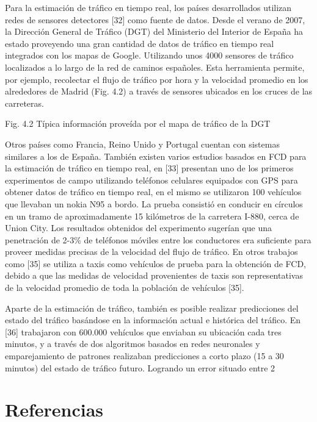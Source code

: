 \documentclass[final,fmstyle]{fpunathesis}
\begin{document}
Para la estimación de tráfico en tiempo real, los países desarrollados utilizan redes de sensores detectores [32] como fuente de datos. Desde el verano de 2007, la Dirección General de Tráfico (DGT) del Ministerio del Interior de España ha estado proveyendo una gran cantidad de datos de tráfico en tiempo real integrados con los mapas de Google. Utilizando unos 4000 sensores de tráfico localizados a lo largo de la red de caminos españoles. Esta herramienta permite, por ejemplo, recolectar el flujo de tráfico por hora y la velocidad promedio en los alrededores de Madrid (Fig. 4.2) a través de sensores ubicados en los cruces de las carreteras.

Fig. 4.2 Típica información proveída por el mapa de tráfico de la DGT

Otros países como Francia, Reino Unido y Portugal cuentan con sistemas similares a los de España. También existen varios estudios basados en FCD para la estimación de tráfico en tiempo real, en [33] presentan uno de los primeros experimentos de campo utilizando teléfonos celulares equipados con GPS para obtener datos de tráfico en tiempo real, en el mismo se utilizaron 100 vehículos que llevaban un nokia N95 a bordo. La prueba consistió en conducir en círculos en un tramo de aproximadamente 15 kilómetros de la carretera I-880, cerca de Union City. Los resultados obtenidos del experimento sugerían que una penetración de 2-3\% de teléfonos móviles entre los conductores era suficiente para proveer medidas precisas de la velocidad del flujo de tráfico. En otros trabajos como [35] se utiliza a taxis como vehículos de prueba para la obtención de FCD, debido a que las medidas de velocidad provenientes de taxis son representativas de la velocidad promedio de toda la población de vehículos [35]. 

Aparte de la estimación de tráfico, también es posible realizar predicciones del estado del tráfico basándose en la información actual e histórica del tráfico. En [36] trabajaron con 600.000 vehículos que enviaban su ubicación cada tres minutos, y a través de dos algoritmos basados en redes neuronales y emparejamiento de patrones realizaban predicciones a corto plazo (15 a 30 minutos) del estado de tráfico futuro. Logrando un error situado entre 2%

\chapter{Referencias}
\end{document}
